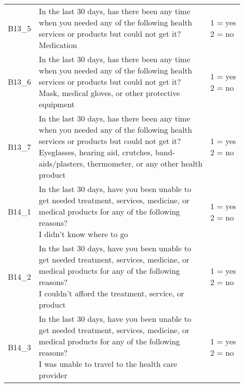 \begin{tabularx}{\linewidth}{p{1.9cm} <{\RaggedRight}X <{\RaggedRight\arraybackslash}p{4.3cm}}
    B13\_5& \thead{In the last 30 days, has there been any time\\ when you needed any of the following health\\ services or products but could not get it?\\Medication} & \thead{1 = yes\\2 = no} \\
    B13\_6& \thead{In the last 30 days, has there been any time\\ when you needed any of the following health\\ services or products but could not get it?\\Mask, medical gloves, or other protective \\equipment} & \thead{1 = yes\\2 = no} \\
    B13\_7& \thead{In the last 30 days, has there been any time\\ when you needed any of the following health\\ services or products but could not get it?\\Eyeglasses, hearing aid, crutches, band-\\aids/plasters, thermometer, or any other health\\ product} & \thead{1 = yes\\2 = no} \\
    B14\_1& \thead{In the last 30 days, have you been unable to\\ get needed treatment, services, medicine, or\\ medical products for any of the following\\ reasons?\\I didn't know where to go} & \thead{1 = yes\\2 = no}\\
    B14\_2& \thead{In the last 30 days, have you been unable to\\ get needed treatment, services, medicine, or\\ medical products for any of the following\\ reasons?\\I couldn't afford the treatment, service, or\\ product} & \thead{1 = yes\\2 = no}\\
    B14\_3& \thead{In the last 30 days, have you been unable to\\ get needed treatment, services, medicine, or\\ medical products for any of the following\\ reasons?\\I was unable to travel to the health care\\ provider} & \thead{1 = yes\\2 = no}\\

\end{tabularx}
